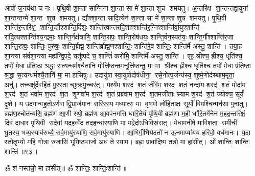 आपो॑ ज॒नय॑था च नः। पृ॒थि॒वी शा॒न्ता साग्निना॑ शा॒न्ता सा मे॑ शा॒न्ता शुच शमयतु। अ॒न्तरि॑क्ष शा॒न्तन्तद्वा॒युना॑ शा॒न्तन्तन्मे॑ शा॒न्त शुच शमयतु। द्यौश्शा॒न्ता सादि॒त्येन॑ शा॒न्ता सा मे॑ शा॒न्ता शुच शमयतु। पृ॒थि॒वी शान्ति॑र॒न्तरि॑क्ष॒ शान्ति॒र्द्यौश्शान्ति॒र्दिशः॒ शान्ति॑रवान्तरदि॒शाश्शान्ति॑र॒ग्निश्शान्ति॑र्वा॒युश्शान्ति॑- रादि॒त्यश्शान्ति॑श्च॒न्द्रमाः॒ शान्ति॒र्नक्ष॑त्राणि॒ शान्ति॒रापः॒ शान्ति॒रोष॑धयः॒ शान्ति॒र्वन॒स्पत॑यः॒ शान्ति॒र्गौश्शान्ति॑र॒जा शान्ति॒रश्वः॒ शान्तिः॒ पुरु॑षः॒ शान्ति॒र्ब्रह्म॒ शान्ति॑र्ब्राह्म॒णश्शान्तिः॒ शान्ति॑रे॒व शान्तिः॒ शान्ति॑र्मे अस्तु॒ शान्ति॑। तया॒ह शा॒न्त्या स॑र्वशा॒न्त्या मह्य॑न्द्वि॒पदे॒ चतु॑ष्पदे च॒ शान्तिं॑ करोमि॒ शान्ति॑र्मे अस्तु॒ शान्ति॑। एह॒ श्रीश्च॒ ह्रीश्च॒ धृति॑श्च॒ तपो॑ मे॒धा प्र॑ति॒ष्ठा श्र॒द्धा स॒त्यन्धर्म॑श्चै॒तानि॒ मोत्ति॑ष्ठन्त॒मनूत्ति॑ष्ठन्तु॒ मा मा॒ श्रीश्च॒ ह्रीश्च॒ धृति॑श्च॒ तपो॑ मे॒धा प्र॑ति॒ष्ठा श्र॒द्धा स॒त्यन्धर्म॑श्चै॒तानि॑ मा॒ मा हा॑सिषुः। उदायु॑षा स्वा॒युषोदोष॑धीना॒ रसे॒नोत्प॒र्जन्य॑स्य॒ शुष्मे॒णोद॑स्थाम॒मृता॒ अनु॑। तच्चक्षु॑र्दे॒वहि॑तं पु॒रस्ताच्छु॒क्रमु॒च्चर॑त्। पश्ये॑म श॒रद॑ श॒तं जीवे॑म श॒रद॑ श॒तं नन्दा॑म श॒रद॑ श॒तं मोदा॑म श॒रद॑ श॒तं भवा॑म श॒रद॑ श॒त शृ॒णवा॑म श॒रद॑ श॒तं प्रब्र॑वाम श॒रद॑ श॒तमजी॑ताः स्याम श॒रद॑ श॒तं ज्योक्च॒ सूर्यं॑ दृ॒शे। य उद॑गान्मह॒तोऽर्णवाद्वि॒भ्राज॑मानः सरि॒रस्य॒ मध्या॒त्स मा वृष॒भो लो॑हिता॒क्षः सूर्यो॑ विप॒श्चिन्मन॑सा पुनातु। ब्रह्म॑ण॒श्चोत॑न्यसि॒ ब्रह्म॑ण आ॒णी स्थो॒ ब्रह्म॑ण आ॒वप॑नमसि धारि॒तेयं पृ॑थि॒वी ब्रह्म॑णा म॒ही धा॑रि॒तमे॑नेन म॒हद॒न्तरि॑क्षं॒ दिवं॑ दाधार पृथि॒वी सदे॑वां॒ यद॒हव्वेँद॒ तद॒हन्धा॑रयाणि॒ मा मद्वेदोऽधि॒विस्र॑सत्। मे॒धा॒म॒नी॒षे मावि॑शता स॒मीची॑ भू॒तस्य॒ भव्य॒स्याव॑रुध्यै॒ सर्व॒मायु॑रयाणि॒ सर्व॒मायु॑रयाणि। आ॒भिर्गी॒र्भिर्यदतो॑ न ऊ॒नमाप्या॑यय हरिवो॒ वर्ध॑मानः। य॒दा स्तो॒तृभ्यो॒ महि॑ गो॒त्रा रु॒जासि॑ भूयिष्ठ॒भाजो॒ अध॑ ते स्याम। ब्रह्म॒ प्रावा॑दिष्म॒ तन्नो॒ मा हा॑सीत्। ओं शान्तिः॒ शान्तिः॒ शान्ति॑॥९३॥

\setcounter{anuvakam}{0}

ॐ शं नस्तन्नो॒ मा हा॑सीत्॥ ॐ शान्तिः॒ शान्तिः॒शान्ति॑॥

